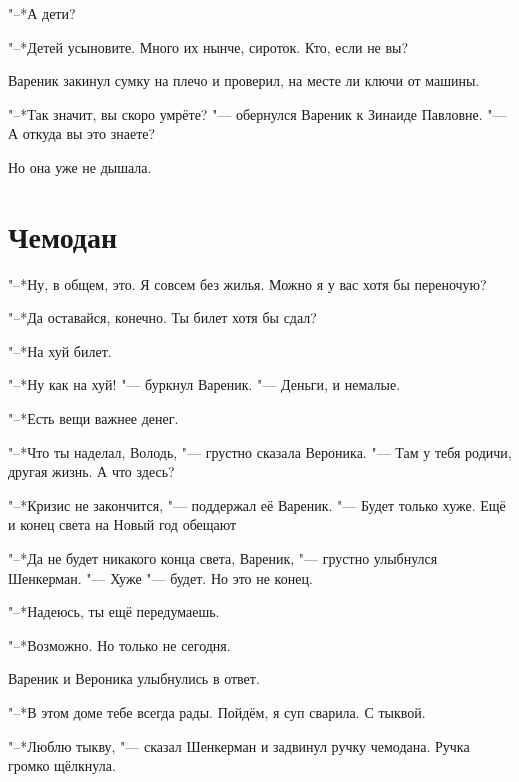 "--*А дети?

"--*Детей усыновите.
Много их нынче, сироток.
Кто, если не вы?

Вареник закинул сумку на плечо и проверил, на месте ли ключи от машины.

"--*Так значит, вы скоро умрёте? "--- обернулся Вареник к Зинаиде Павловне. 
"--- А откуда вы это знаете?

Но она уже не дышала.

\section{Чемодан}

"--*Ну, в общем, это.
Я совсем без жилья.
Можно я у вас хотя бы переночую?

"--*Да оставайся, конечно.
Ты билет хотя бы сдал?

"--*На хуй билет.

"--*Ну как на хуй! "--- буркнул Вареник.
"--- Деньги, и немалые.

"--*Есть вещи важнее денег.

"--*Что ты наделал, Володь, "--- грустно сказала Вероника.
"--- Там у тебя родичи, другая жизнь.
А что здесь?

"--*Кризис не закончится, "--- поддержал её Вареник.
"--- Будет только хуже.
Ещё и конец света на Новый год обещают\ldotst

"--*Да не будет никакого конца света, Вареник, "--- грустно улыбнулся Шенкерман.
"--- Хуже "--- будет.
Но это не конец.

"--*Надеюсь, ты ещё передумаешь.

"--*Возможно.
Но только не сегодня.

Вареник и Вероника улыбнулись в ответ.

"--*В этом доме тебе всегда рады.
Пойдём, я суп сварила.
С тыквой.

"--*Люблю тыкву, "--- сказал Шенкерман и задвинул ручку чемодана.
Ручка громко щёлкнула.
